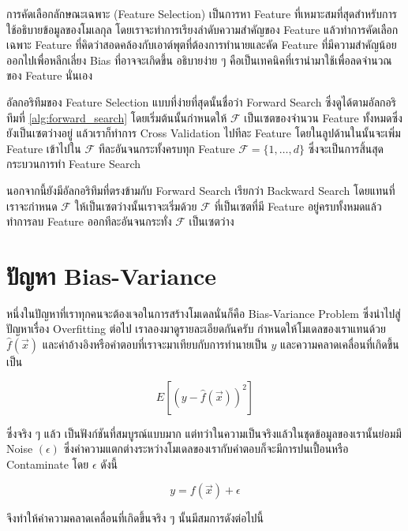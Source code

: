 การคัดเลือกลักษณะเฉพาะ (Feature Selection) เป็นการหา Feature ที่เหมาะสมที่สุดสำหรับการใช้อธิบายข้อมูลของโมเลกุล โดยเราจะทำการเรียงลำดับความสำคัญของ Feature แล้วทำการคัดเลือกเฉพาะ Feature ที่คิดว่าสอดคล้องกับเอาต์พุตที่ต้องการทำนายและคัด Feature ที่มีความสำคัญน้อยออกไปเพื่อหลีกเลี่ยง Bias ที่อาจจะเกิดขึ้น อธิบายง่าย ๆ คือเป็นเทคนิคที่เรานำมาใช้เพื่อลดจำนวณของ Feature นั่นเอง 

อัลกอริทึมของ Feature Selection แบบที่ง่ายที่สุดนั้นชื่อว่า Forward Search ซึ่งดูได้ตามอัลกอริทึมที่ \ref{alg:forward_search} โดยเริ่มต้นนั้นกำหนดให้ $\mathcal{F}$ เป็นเซตของจำนวน Feature ทั้งหมดซึ่งยังเป็นเซตว่างอยู่ แล้วเราก็ทำการ Cross Validation ไปทีละ Feature
โดยในลูปด้านในนั้นจะเพิ่ม Feature เข้าไปใน $\mathcal{F}$ ทีละอันจนกระทั้งครบทุก Feature $\mathcal{F} = \{1,\ldots ,d\}$ 
ซึ่งจะเป็นการสิ้นสุดกระบวนการทำ Feature Search 

นอกจากนี้ยังมีอัลกอริทึมที่ตรงข้ามกับ Forward Search เรียกว่า Backward Search โดยแทนที่เราจะกำหนด $\mathcal{F}$ ให้เป็นเซตว่างนั้นเราจะเริ่มด้วย $\mathcal{F}$ ที่เป็นเซตที่มี Feature อยู่ครบทั้งหมดแล้วทำการลบ Feature ออกทีละอันจนกระทั่ง $\mathcal{F}$ เป็นเซตว่าง

\section{ปัญหา Bias-Variance}
\label{sec:bias_var_prob}

หนึ่งในปัญหาที่เราทุกคนจะต้องเจอในการสร้างโมเดลนั่นก็คือ Bias-Variance Problem ซึ่งนำไปสู่ปัญหาเรื่อง Overfitting ต่อไป
เราลองมาดูรายละเอียดกันครับ กำหนดให้โมเดลของเราแทนด้วย $\hat{f}(\vec{x})$ และค่าอ้างอิงหรือคำตอบที่เราจะมาเทียบกับการทำนายเป็น 
$y$ และความคลาดเคลื่อนที่เกิดขึ้นเป็น

\begin{equation}
    E\left[\left(y - \hat{f}(\vec{x})\right)^2\right]
\end{equation}

ซึ่งจริง ๆ แล้ว เป็นฟังก์ชันที่สมบูรณ์แบบมาก แต่ทว่าในความเป็นจริงแล้วในชุดข้อมูลของเรานั้นย่อมมี Noise $(\epsilon)$ ซึ่งค่าความแตกต่างระหว่างโมเดลของเรากับคำตอบก็จะมีการปนเปื้อนหรือ Contaminate โดย $\epsilon$ ดังนี้

\begin{equation}
    y = f(\vec{x}) + \epsilon
\end{equation}

\noindent จึงทำให้ค่าความคลาดเคลื่อนที่เกิดขึ้นจริง ๆ นั้นมีสมการดังต่อไปนี้ 

